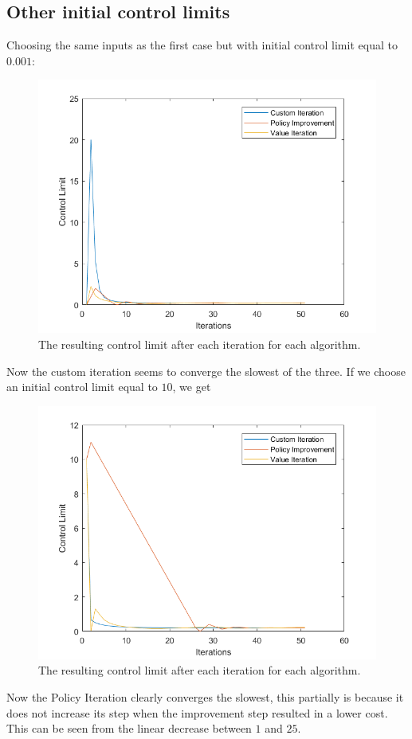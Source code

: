 \subsection{Other initial control limits}
Choosing the same inputs as the first case but with initial control limit equal to $0.001$:
\begin{figure}[H]
\centering
\includegraphics[width=\textwidth]{Plots/CL Weibull2-2 Discount-1 Start-0.001.png}
\caption{The resulting control limit after each iteration for each algorithm.}
\end{figure}
Now the custom iteration seems to converge the slowest of the three.
If we choose an initial control limit equal to $10$, we get
\begin{figure}[H]
\centering
\includegraphics[width=\textwidth]{Plots/CL Weibull2-2 Discount-1 Start-10.png}
\caption{The resulting control limit after each iteration for each algorithm.}
\label{fig:linearDecrease}
\end{figure}
Now the Policy Iteration clearly converges the slowest, this partially is because it does not increase its step when the improvement step resulted in a lower cost.
This can be seen from the linear decrease between $1$ and $25$.
